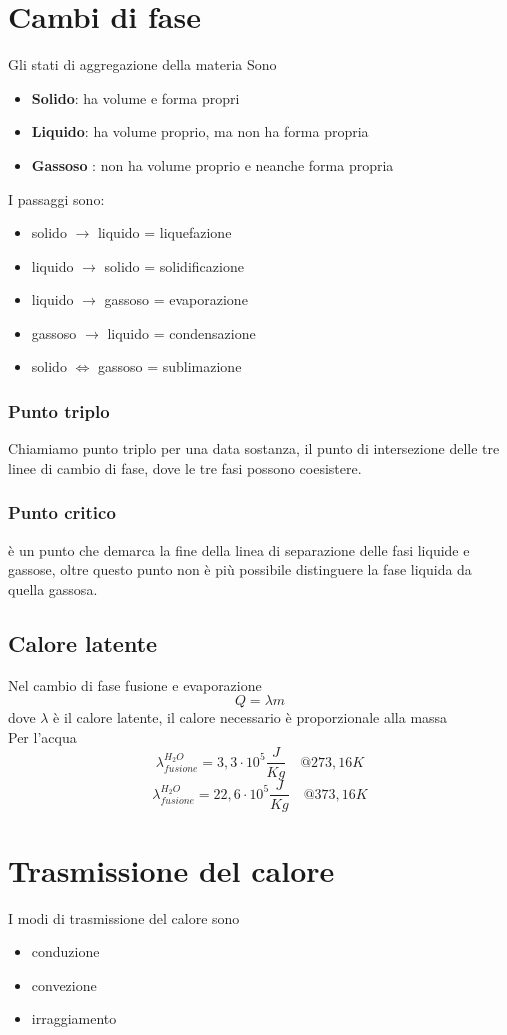 \documentclass[a4paper]{report}
\begin{document}
  \section{Cambi di fase}
  Gli stati di aggregazione della materia Sono
  \begin{itemize}
    \item \textbf{Solido}: ha volume e forma propri
    \item \textbf{Liquido}: ha volume proprio, ma non ha forma propria
    \item \textbf{Gassoso} : non ha volume proprio e neanche forma propria
  \end{itemize}
  I passaggi sono:
  \begin{itemize}
    \item solido $\rightarrow$ liquido = liquefazione
    \item liquido $\rightarrow$ solido = solidificazione
    \item liquido $\rightarrow$ gassoso = evaporazione
    \item gassoso $\rightarrow$ liquido = condensazione
    \item solido $\iff$ gassoso = sublimazione
  \end{itemize}
  \subsubsection{Punto triplo}
  Chiamiamo punto triplo per una data sostanza, il punto di intersezione delle tre linee di cambio di fase, dove le tre fasi possono coesistere.
  \subsubsection{Punto critico}
  è un punto che demarca la fine della linea di separazione delle fasi liquide e gassose, oltre questo punto non è più possibile distinguere la fase liquida da quella gassosa.
  \subsection{Calore latente}
  Nel cambio di fase fusione e evaporazione
  $$ Q = \lambda m$$
  dove $\lambda$ è il calore latente, il calore necessario è proporzionale alla massa\\
  Per l'acqua
  $$ \lambda_{fusione}^{H_2O} = 3,3 \cdot 10^5 \frac{J}{Kg} \quad @ 273,16 K $$
  $$ \lambda_{fusione}^{H_2O} = 22,6 \cdot 10^5 \frac{J}{Kg} \quad @ 373,16K $$

  \section{Trasmissione del calore}
  I modi di trasmissione del calore sono
  \begin{itemize}
    \item conduzione
    \item convezione
    \item irraggiamento
  \end{itemize}
\end{document}
